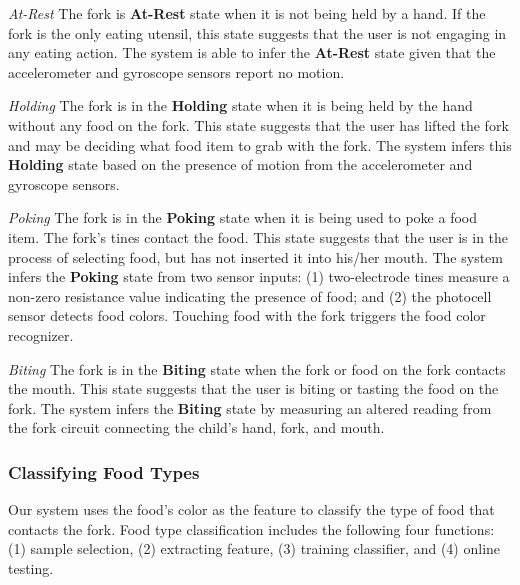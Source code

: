 \textit{At-Rest}
\newline
The fork is \textbf{At-Rest} state when it is not being held by a hand. 
If the fork is the only eating utensil, this state suggests that the user is not engaging in any eating action. 
The system is able to infer the \textbf{At-Rest} state given that the accelerometer and gyroscope sensors report no motion.

\textit{Holding}
\newline
The fork is in the \textbf{Holding} state when it is being held by the hand without any food on the fork. 
This state suggests that the user has lifted the fork and may be deciding what food item to grab with the fork. 
The system infers this \textbf{Holding} state based on the presence of motion from the accelerometer and gyroscope sensors.

\textit{Poking}
\newline
The fork is in the \textbf{Poking} state 
when it is being used to poke a food item. 
The fork's tines contact the food. 
This state suggests that the user is in the process of selecting food, 
but has not inserted it into his/her mouth. 
The system infers the \textbf{Poking} state from two sensor inputs: 
(1) two-electrode tines measure a non-zero resistance value indicating the presence of food; 
and (2) the photocell sensor detects food colors. Touching food with the fork triggers the food color recognizer. 

\textit{Biting}
\newline
The fork is in the \textbf{Biting} state when the fork or food on the fork contacts the mouth. 
This state suggests that the user is biting or tasting the food on the fork. 
The system infers the \textbf{Biting} state by measuring an altered reading 
from the fork circuit connecting the child's hand, fork, and mouth. 

\subsubsection{Classifying Food Types}
Our system uses the food's color as the feature to classify the type of food that contacts the fork. 
Food type classification includes the following four functions:
(1) sample selection, (2) extracting feature, (3) training classifier, and (4) online testing. 

